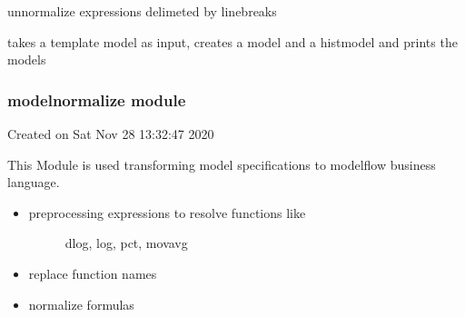 \documentclass[letterpaper,10pt,english]{sphinxmanual}
\begin{document}

\begin{fulllineitems}
\label{\detokenize{onboard/modelmanipulation:modelmanipulation.un_normalize_simpel}}
\pysigstartsignatures
{}
\pysigstopsignatures
\sphinxAtStartPar
un\sphinxhyphen{}normalize expressions delimeted by linebreaks

\end{fulllineitems}


\begin{fulllineitems}
\label{\detokenize{onboard/modelmanipulation:modelmanipulation.eksempel}}
\pysigstartsignatures
{}
\pysigstopsignatures
\sphinxAtStartPar
takes a template model as input, creates a model and a histmodel and prints the models

\end{fulllineitems}


\sphinxstepscope


\subsubsection{modelnormalize module}
\label{\detokenize{onboard/modelnormalize:module-modelnormalize}}\label{\detokenize{onboard/modelnormalize:modelnormalize-module}}\label{\detokenize{onboard/modelnormalize::doc}}
\sphinxAtStartPar
Created on Sat Nov 28 13:32:47 2020

\sphinxAtStartPar
This Module is used transforming model specifications to modelflow business language.
\begin{itemize}
\item {} \begin{description}
\item[{preprocessing expressions to resolve functions like}] \leavevmode
\sphinxAtStartPar
dlog, log, pct, movavg

\end{description}

\item {} 
\sphinxAtStartPar
replace function names

\item {} 
\sphinxAtStartPar
normalize formulas

\end{itemize}
\end{document}
